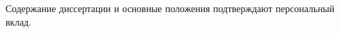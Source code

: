 {\begin{refsection}
            \fi%
        \fi%
    \end{refsection}%
%
}%

{\contribution}

Содержание диссертации и основные положения подтверждают персональный вклад.

